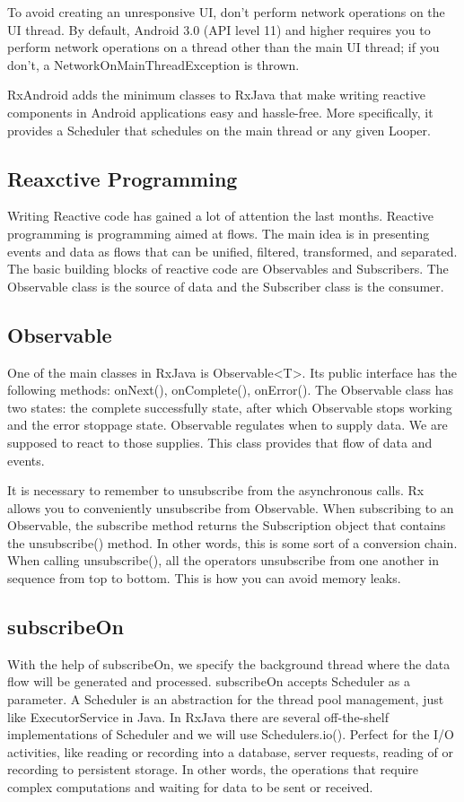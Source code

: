 \begin{framed}
	To avoid creating an unresponsive UI, don't perform network operations on the UI thread. By default, Android 3.0 (API level 11) and higher requires you to perform network operations on a thread other than the main UI thread; if you don't, a NetworkOnMainThreadException is thrown.
\end{framed}

RxAndroid adds the minimum classes to RxJava that make writing reactive components in Android applications easy and hassle-free. More specifically, it provides a Scheduler that schedules on the main thread or any given Looper. 

\subsection{Reaxctive Programming}
Writing Reactive code has gained a lot of attention the last months. Reactive programming is programming aimed at flows.
The main idea is in presenting events and data as flows that can be unified, filtered, transformed, and separated.
The basic building blocks of reactive code are Observables and Subscribers. The Observable class is the source of data and the Subscriber class is the consumer.

\subsection{Observable}
One of the main classes in RxJava is Observable<T>.
Its public interface has the following methods: onNext(), onComplete(), onError().
The Observable class has two states: the complete successfully state, after which Observable stops working and the error stoppage state.
Observable regulates when to supply data. We are supposed to react to those supplies. This class provides that flow of data and events.

It is necessary to remember to unsubscribe from the asynchronous calls.
Rx allows you to conveniently unsubscribe from Observable.
When subscribing to an Observable, the subscribe method returns the Subscription object that contains the unsubscribe() method.
In other words, this is some sort of a conversion chain.
When calling unsubscribe(), all the operators unsubscribe from one another in sequence from top to bottom.
This is how you can avoid memory leaks.

\subsection{subscribeOn}
With the help of subscribeOn, we specify the background thread where the data flow will be generated and processed.
subscribeOn accepts Scheduler as a parameter.
A Scheduler is an abstraction for the thread pool management, just like ExecutorService in Java.
In RxJava there are several off-the-shelf implementations of Scheduler and we will use Schedulers.io().
Perfect for the I/O activities, like reading or recording into a database, server requests, reading of or recording to persistent storage.
In other words, the operations that require complex computations and waiting for data to be sent or received.

